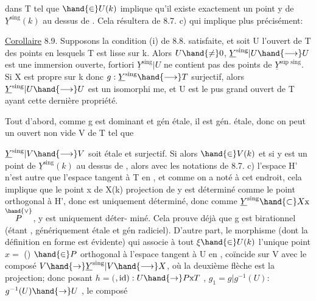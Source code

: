 

dans T tel que \hand{$\xi$} $\hand{\in} U(k)$  implique qu'il existe exactement  un point  y de
$\underline{Y}^{\text{sing}}(k)$ au dessus de \hand{$\xi$}. Cela résultera de 8.7. c) qui implique plus
 précisément:

\uline{Corollaire} 8.9.  Supposons la condition (i) de 8.8. satisfaite, et
soit  
U l'ouvert de T des points en lesquels T est lisse sur k. Alors $U\hand{\neq} 0$, 
$\underline{Y}^{\text{sing}}|U \hand{\longrightarrow} U$ est une immersion ouverte,   fortiori $\underline{Y}^{\text{sing}}|U$ ne contient pas des points de $\underline{Y}^{\text{sup sing}}$.
 Si X est propre sur
k donc $g:\underline{Y}^{\text{sing}}\hand{\longrightarrow} T$ surjectif, alors $\underline{Y}^{\text{sing}}|U\hand{\longrightarrow} U$ est un isomorphi
me, et U est le pus grand ouvert de T ayant cette dernière propriété.

Tout d'abord, comme g est dominant et gén  étale, il est
gén. étale, donc on peut  un ouvert non vide V de T tel que

$\underline{Y}^{\text{sing}}|V \hand{\longrightarrow} V$ soit étale et surjectif. Si alors \hand{$\xi$}$\hand{\in} V(k)$ et si y est
un point de $\underline{Y}^{\text{sing}}(k)$ au dessus de \hand{$\xi$}, alors avec les notations de
8.7. c)  l'espace H' n'est autre que l'espace tangent à T en \hand{$\xi$},
et comme on a noté à cet endroit, cela implique que le point x de X(k)
projection de y est déterminé comme le point orthogonal à H', donc est
uniquement déterminé, donc comme $\underline{Y}^{\text{sing}}\hand{\subset} X\text{x}$$\overset{\hand{\vee}}{P}$, y est uniquement déter-%
miné. Cela prouve déjà que g est birationnel (étant , 
génériquement  étale et gén radiciel). 
D'autre part, le morphisme \hand{$\unsure{\mu|\psi}$}(dont la définition en forme est évidente)
qui associe à tout $\xi$$\hand{\in} U(k)$ l'unique point $x=$ \hand{$\mu$}(\hand{$\xi$}) $\hand{\in} P$ orthogonal à
l'espace tangent à U en \hand{$\xi$}, coïncide sur V avec le composé
$V\hand{\rightarrow} \underline{Y}^{\text{sing}}|V \hand{\longrightarrow} X$, où la deuxième flèche est la projection; donc
posant  $h=($\hand{$\mu$}$,\mathrm{id}) : U\hand{\rightarrow} P\text{x}T$ , 
 $g_1 = g|g^{-1}(U)$: $g^{-1}(U)\hand{\rightarrow} U$ , le composé

